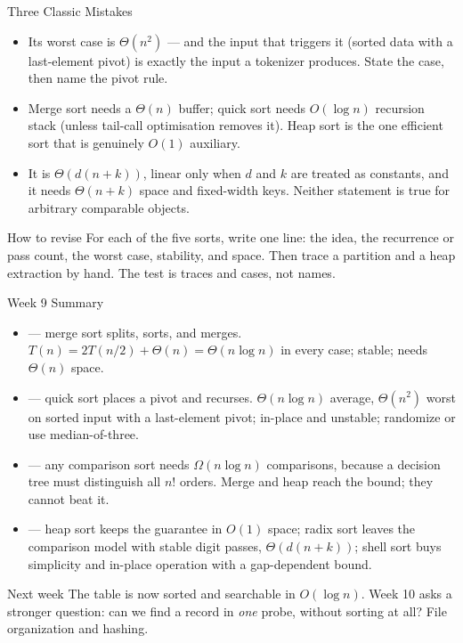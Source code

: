 \documentclass[aspectratio=169]{beamer}
\begin{document}
\begin{frame}{Three Classic Mistakes}
  \begin{itemize}
    \item {} Its worst case
      is $\Theta(n^2)$ --- and the input that triggers it (sorted data with a
      last-element pivot) is exactly the input a tokenizer produces. State
      the case, then name the pivot rule.
    \item {}
      Merge sort needs a $\Theta(n)$ buffer; quick sort needs $O(\log n)$
      recursion stack (unless tail-call optimisation removes it). Heap sort
      is the one efficient sort that is genuinely $O(1)$ auxiliary.
    \item {} It is
      $\Theta(d(n+k))$, linear only when $d$ and $k$ are treated as
      constants, and it needs $\Theta(n+k)$ space and fixed-width keys.
      Neither statement is true for arbitrary comparable objects.
  \end{itemize}
  \begin{exampleblock}{How to revise}
    For each of the five sorts, write one line: the idea, the recurrence or
    pass count, the worst case, stability, and space. Then trace a partition
    and a heap extraction by hand. The test is traces and cases, not names.
  \end{exampleblock}
\end{frame}

\begin{frame}{Week 9 Summary}
  \begin{itemize}
    \item {} --- merge sort splits, sorts, and merges.
      $T(n)=2T(n/2)+\Theta(n)=\Theta(n\log n)$ in every case; stable; needs
      $\Theta(n)$ space.
    \item {} --- quick sort places a pivot and recurses.
      $\Theta(n\log n)$ average, $\Theta(n^2)$ worst on sorted input with a
      last-element pivot; in-place and unstable; randomize or use
      median-of-three.
    \item {} --- any comparison sort needs $\Omega(n\log n)$
      comparisons, because a decision tree must distinguish all $n!$ orders.
      Merge and heap reach the bound; they cannot beat it.
    \item {} --- heap sort keeps the guarantee in
      $O(1)$ space; radix sort leaves the comparison model with stable digit
      passes, $\Theta(d(n+k))$; shell sort buys simplicity and in-place
      operation with a gap-dependent bound.
  \end{itemize}
  \begin{exampleblock}{Next week}
    The table is now sorted and searchable in $O(\log n)$. Week 10 asks a
    stronger question: can we find a record in \emph{one} probe, without
    sorting at all? File organization and hashing.
  \end{exampleblock}
  \vspace{-0.2cm}
\end{frame}
\end{document}
